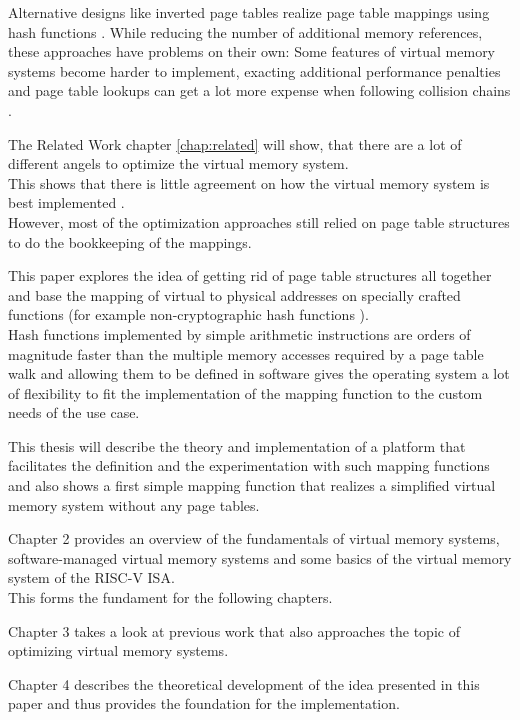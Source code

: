 Alternative designs like inverted page tables realize page table mappings using hash functions \cite{tanenbaumOS}. While reducing the number of additional memory references, these approaches have problems on their own: Some features of virtual memory systems become harder to implement, exacting additional performance penalties \cite{yaniv2016hash} and page table lookups can get a lot more expense when following collision chains \cite{jacob1998look}.

The Related Work chapter \ref{chap:related} will show, that there are a lot of different angels to optimize the virtual memory system.\\
This shows that there is little agreement on how the virtual memory system is best implemented \cite{jacob1998look}.\\
However, most of the optimization approaches still relied on page table structures to do the bookkeeping of the mappings.

This paper explores the idea of getting rid of page table structures all together and base the mapping of virtual to physical addresses on specially crafted functions (for example non-cryptographic hash functions \cite{mittelbach2021non}).\\
Hash functions implemented by simple arithmetic instructions are orders of magnitude faster than the multiple memory accesses required by a page table walk \cite{tanenbaumOS} and allowing them to be defined in software gives the operating system a lot of flexibility to fit the implementation of the mapping function to the custom needs of the use case.

This thesis will describe the theory and implementation of a platform that facilitates the definition and the experimentation with such mapping functions and also shows a first simple mapping function that realizes a simplified virtual memory system without any page tables.


Chapter 2 provides an overview of the fundamentals of virtual memory systems, software-managed virtual memory systems and some basics of the virtual memory system of the RISC-V ISA.\\
This forms the fundament for the following chapters.

Chapter 3 takes a look at previous work that also approaches the topic of optimizing virtual memory systems.

Chapter 4 describes the theoretical development of the idea presented in this paper and thus provides
the foundation for the implementation.\\

